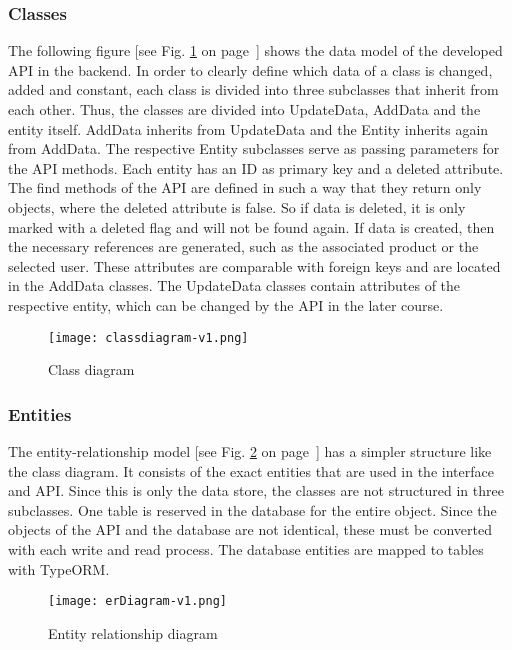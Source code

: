     \subsubsection*{Classes}
    The following figure [see Fig. \ref{fig: classdiagram} on page~\pageref{fig: classdiagram}] shows the data model of the developed API in the backend. In order to clearly define which data of a class is changed, added and constant, each class is divided into three subclasses that inherit from each other. Thus, the classes are divided into UpdateData, AddData and the entity itself. AddData inherits from UpdateData and the Entity inherits again from AddData. The respective Entity subclasses serve as passing parameters for the API methods. Each entity has an ID as primary key and a deleted attribute. The find methods of the API are defined in such a way that they return only objects, where the deleted attribute is false. So if data is deleted, it is only marked with a deleted flag and will not be found again. If data is created, then the necessary references are generated, such as the associated product or the selected user. These attributes are comparable with foreign keys and are located in the AddData classes. The UpdateData classes contain attributes of the respective entity, which can be changed by the API in the later course. 

    \begin{figure}[h]
        \centering
        \texttt{[image: classdiagram-v1.png]}
        \caption{Class diagram}
        \label{fig: classdiagram}
    \end{figure}


    \subsubsection*{Entities}
    The entity-relationship model [see Fig. \ref{fig: erDiagram} on page~\pageref{fig: erDiagram}] has a simpler structure like the class diagram. It consists of the exact entities that are used in the interface and API. Since this is only the data store, the classes are not structured in three subclasses. One table is reserved in the database for the entire object. Since the objects of the API and the database are not identical, these must be converted with each write and read process. The database entities are mapped to tables with TypeORM. 

    \begin{figure}[h]
        \centering
        \texttt{[image: erDiagram-v1.png]}
        \caption{Entity relationship diagram}
        \label{fig: erDiagram}
    \end{figure}

